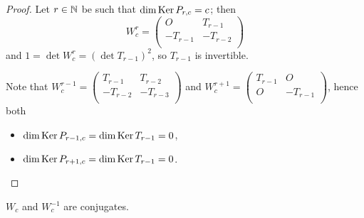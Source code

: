 \begin{proof}
  Let $r\in\mathbb{N}$ be such that $\dim\operatorname{Ker} P_{r,c} = c$; then
  \[
  W_{c}^{r}
  =
  \left(
  \begin{array}{cc}
     O    &  T_{r-1}  \\
    -T_{r-1} & -T_{r-2} \\
  \end{array}
  \right)
  \]
  and $1 = \det W_{c}^{r} = (\det T_{r-1})^{2}$, so $T_{r-1}$ is
  invertible.

  Note that
  $W_{c}^{r-1} = \left(\begin{smallmatrix} T_{r-1} & T_{r-2} \\-T_{r-2} & -T_{r-3} \\\end{smallmatrix}\right)$
  and
  $W_{c}^{r+1} = \left(\begin{smallmatrix} T_{r-1} & O \\ O & -T_{r-1} \\\end{smallmatrix}\right)$,
  hence both
  \begin{itemize}
    \item $\dim\operatorname{Ker} P_{r-1,c} = \dim\operatorname{Ker} T_{r-1} = 0$,
    \item $\dim\operatorname{Ker} P_{r+1,c} = \dim\operatorname{Ker} T_{r-1} = 0$.
  \end{itemize}
\end{proof}

\begin{lemma}
  $W_{c}$ and $W_{c}^{-1}$ are conjugates.
\end{lemma}

